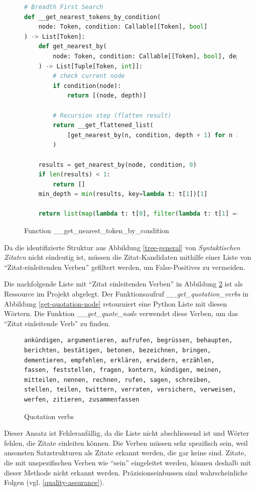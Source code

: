 \begin{figure}[H]
    \begin{lstlisting}[language=Python]
# Breadth First Search
def __get_nearest_tokens_by_condition(
    node: Token, condition: Callable[[Token], bool]
) -> List[Token]:
    def get_nearest_by(
        node: Token, condition: Callable[[Token], bool], depth: int
    ) -> List[Tuple[Token, int]]:
        # check current node
        if condition(node):
            return [(node, depth)]

        # Recursion step (flatten result)
        return __get_flattened_list(
            [get_nearest_by(n, condition, depth + 1) for n in node.children]
        )

    results = get_nearest_by(node, condition, 0)
    if len(results) < 1:
        return []
    min_depth = min(results, key=lambda t: t[1])[1]

    return list(map(lambda t: t[0], filter(lambda t: t[1] == min_depth, results)))
    \end{lstlisting}
    \caption{Function \_\_get\_nearest\_token\_by\_condition}
    \label{get-token-by-condition}
\end{figure}

Da die identifizierte Struktur aus Abbildung \ref{tree-general} von \textsl{Syntaktischen Zitaten} nicht eindeutig ist, müssen die Zitat-Kandidaten
mithilfe einer Liste von \enquote{Zitat-einleitenden Verben} gefiltert werden, um False-Positives zu vermeiden.

Die nachfolgende Liste mit \enquote{Zitat einleitenden Verben} in Abbildung \ref{quotation-verbs} ist als Ressource im Projekt abgelegt.
Der Funktionsaufruf \textsl{\_\_get\_quotation\_verbs}  in Abbildung \ref{get-quotation-node} retourniert eine Python Liste mit diesen
Wörtern. Die Funktion \textsl{\_\_get\_quote\_node} verwendet diese Verben, um das \enquote{Zitat einleitende Verb} zu finden.

\begin{figure}[H]
    \begin{lstlisting}
ankündigen, argumentieren, aufrufen, begrüssen, behaupten, berichten, bestätigen, betonen, bezeichnen, bringen, dementieren, empfehlen, erklären, erwidern, erzählen, fassen, feststellen, fragen, kontern, kündigen, meinen, mitteilen, nennen, rechnen, rufen, sagen, schreiben, stellen, teilen, twittern, verraten, versichern, verweisen, werfen, zitieren, zusammenfassen
    \end{lstlisting}
    \caption{Quotation verbs}
    \label{quotation-verbs}
\end{figure}

Dieser Ansatz ist Fehleranfällig, da die Liste nicht abschliessend ist und Wörter fehlen, die Zitate einleiten können.
Die Verben müssen sehr spezifisch sein, weil ansonsten Satzstrukturen als Zitate erkannt werden, die gar keine sind.
Zitate, die mit unspezifischen Verben wie \enquote{sein} eingeleitet werden, können deshalb mit dieser Methode nicht erkannt werden.
Präzisionseinbussen sind wahrscheinliche Folgen (vgl. \ref{quality-assurance}).

